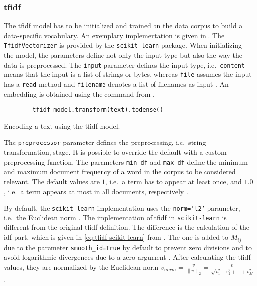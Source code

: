 \subsubsection*{\ac{tfidf}}\label{subsubsec:impl-tfidf}

The \ac{tfidf} model has to be initialized and trained on the data corpus to build a data-specific vocabulary.
An exemplary implementation is given in .
The \texttt{TfidfVectorizer} is provided by the \texttt{scikit-learn} package.
When initializing the model, the parameters define not only the input type but also the way the data is preprocessed.
The \texttt{input} parameter defines the input type, i.e.\ \texttt{content} means that the input is a list of strings or bytes, 
whereas \texttt{file} assumes the input has a \texttt{read} method and \texttt{filename} denotes a list of filenames as input \cite{tfidf-scikit-learn}.
An embedding is obtained using the command from .

\begin{listing}[htp]
    \begin{verbatim}
        tfidf_model.transform(text).todense()
    \end{verbatim}
    \caption[Encoding a text using the \ac{tfidf} model]{Encoding a text using the \ac{tfidf} model.
    }
    \label{lst:encode-tfidf}
\end{listing}

The \texttt{preprocessor} parameter defines the preprocessing, i.e.\ string transformation, stage.
It is possible to override the default with a custom preprocessing function.
The parameters \texttt{min\_df} and \texttt{max\_df} define the minimum and maximum document frequency of a word in the corpus to be considered relevant.
The default values are $1$, i.e.\ a term has to appear at least once, and $1.0$, i.e.\ a term appears at most in all documents, respectively \cite{tfidf-scikit-learn}.

By default, the \texttt{scikit-learn} implementation uses the \texttt{norm='l2'} parameter, i.e.\ the Euclidean norm \cite{tfidf-scikit-learn}.
The implementation of \ac{tfidf} in \texttt{scikit-learn} is different from the original \ac{tfidf} definition.
The difference is the calculation of the \ac{idf} part, which is given in \autoref{eq:tfidf-scikit-learn} from \cite{tfidf-scikit-learn}.
The one is added to $M_{ij}$ due to the parameter \texttt{smooth\_id=True} by default to prevent zero divisions \cite{tfidf-scikit-learn}
and to avoid logarithmic divergences due to a zero argument \cite{glove2014}.
After calculating the \ac{tfidf} values, they are normalized by the Euclidean norm 
$v_{norm} = \frac{v}{\left\| v \right\|_{2}} = \frac{v}{\sqrt{v_1^{2} + v_2^{2} + ... + v_M^{2}}}$.

